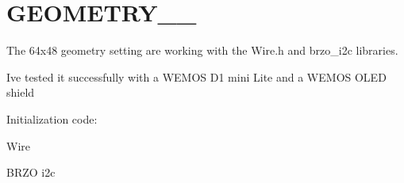 \chapter{GEOMETRY\+\_\+\_}
\hypertarget{md_src_2_e_s_p8266__and___e_s_p32___o_l_e_d__driver__for___s_s_d1306__displays_2_r_e_a_d_m_e___g_e_o_m_e_t_r_y__64__48}{}\label{md_src_2_e_s_p8266__and___e_s_p32___o_l_e_d__driver__for___s_s_d1306__displays_2_r_e_a_d_m_e___g_e_o_m_e_t_r_y__64__48}
\label{md_src_2_e_s_p8266__and___e_s_p32___o_l_e_d__driver__for___s_s_d1306__displays_2_r_e_a_d_m_e___g_e_o_m_e_t_r_y__64__48_autotoc_md32}%
%
 The 64x48 geometry setting are working with the {\ttfamily Wire.\+h} and {\ttfamily brzo\+\_\+i2c} libraries.

I\textquotesingle{}ve tested it successfully with a WEMOS D1 mini Lite and a WEMOS OLED shield

Initialization code\+:


\begin{DoxyItemize}
\item Wire 
\begin{DoxyCode}{0}

\end{DoxyCode}

\item BRZO i2c 
\begin{DoxyCode}{0}

\end{DoxyCode}
 
\end{DoxyItemize}